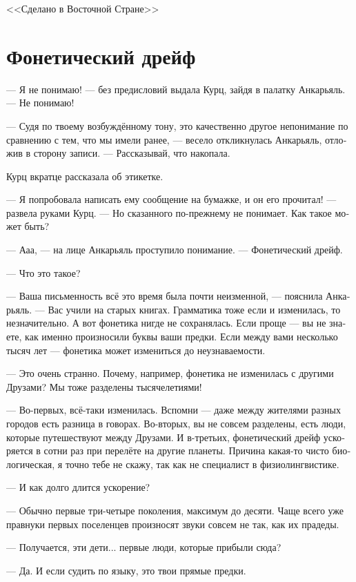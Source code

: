 \documentclass[a4paper,10pt,fleqn]{book}\usepackage{polyglossia}\setdefaultlanguage[babelshorthands=true]{russian}\setotherlanguage{english}\defaultfontfeatures{Ligatures=TeX,Mapping=tex-text}\usepackage{xcolor}\newcommand{\ml}[3]{#2}
\begin{document}
\ml{$0$}
{<<Сделано в Восточной Стране>>}
{\textsc{Made in Eastern Realm}}

\section{Фонетический дрейф}

--- Я не понимаю! --- без предисловий выдала Курц, зайдя в палатку Анкарьяль.
--- Не понимаю!

--- Судя по твоему возбуждённому тону, это качественно другое непонимание по сравнению с тем, что мы имели ранее, --- весело откликнулась Анкарьяль, отложив в сторону записи.
--- Рассказывай, что накопала.

Курц вкратце рассказала об этикетке.

--- Я попробовала написать ему сообщение на бумажке, и он его прочитал! --- развела руками Курц.
--- Но сказанного по-прежнему не понимает.
Как такое может быть?

--- Ааа, --- на лице Анкарьяль проступило понимание.
--- Фонетический дрейф.

--- Что это такое?

--- Ваша письменность всё это время была почти неизменной, --- пояснила Анкарьяль.
--- Вас учили на старых книгах.
Грамматика тоже если и изменилась, то незначительно.
А вот фонетика нигде не сохранялась.
Если проще --- вы не знаете, как именно произносили буквы ваши предки.
Если между вами несколько тысяч лет --- фонетика может измениться до неузнаваемости.

--- Это очень странно.
Почему, например, фонетика не изменилась с другими Друзами?
Мы тоже разделены тысячелетиями!

--- Во-первых, всё-таки изменилась.
Вспомни --- даже между жителями разных городов есть разница в говорах.
Во-вторых, вы не совсем разделены, есть люди, которые путешествуют между Друзами.
И в-третьих, фонетический дрейф ускоряется в сотни раз при перелёте на другие планеты.
Причина какая-то чисто биологическая, я точно тебе не скажу, так как не специалист в физиолингвистике.

--- И как долго длится ускорение?

--- Обычно первые три-четыре поколения, максимум до десяти.
Чаще всего уже правнуки первых поселенцев произносят звуки совсем не так, как их прадеды.

--- Получается, эти дети... первые люди, которые прибыли сюда?

--- Да.
И если судить по языку, это твои прямые предки.
\end{document}
